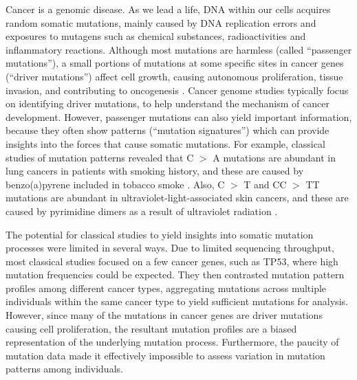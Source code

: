 \documentclass[10pt,letterpaper]{article}
\begin{document}
Cancer is a genomic disease. 
As we lead a life, DNA within our cells acquires random somatic mutations,
mainly caused by DNA replication errors and exposures to mutagens such as chemical substances, radioactivities and inflammatory reactions.  
Although most mutations are harmless (called ``passenger mutations''), 
a small portions of mutations at some specific sites in cancer genes (``driver mutations'') 
affect cell growth,
causing autonomous proliferation, tissue invasion, and contributing to oncogenesis \cite{stratton2009cancer}.
Cancer genome studies typically focus on identifying driver mutations, 
to help understand the mechanism of cancer development.
However, passenger mutations can also yield important information, 
because they often show patterns (``mutation signatures'') which 
can provide insights into the forces that cause somatic mutations.
For example, classical studies of mutation patterns
revealed that C $>$ A mutations are abundant in lung cancers in patients with smoking history,
and these are caused by benzo(a)pyrene included in tobacco smoke \cite{pmid12379884}.
Also, C $>$ T and CC $>$ TT  mutations are abundant in ultraviolet-light-associated skin cancers, 
and these are caused by pyrimidine dimers as a result of ultraviolet radiation \cite{pmid15748635}. 

The potential for classical studies to yield insights into somatic mutation processes
were limited in several ways.
Due to limited sequencing throughput, most classical studies 
focused on a few cancer genes, such as TP53,
where high mutation frequencies could be expected. They then
contrasted mutation pattern profiles among different cancer types,
aggregating mutations across multiple individuals within the same cancer type to
yield sufficient mutations for analysis.
However, since many of the mutations in cancer genes are driver mutations causing cell proliferation,
the resultant mutation profiles are a biased representation of the underlying mutation process.
Furthermore, the paucity of mutation data made it effectively impossible to assess variation in mutation patterns among individuals.
\end{document}
